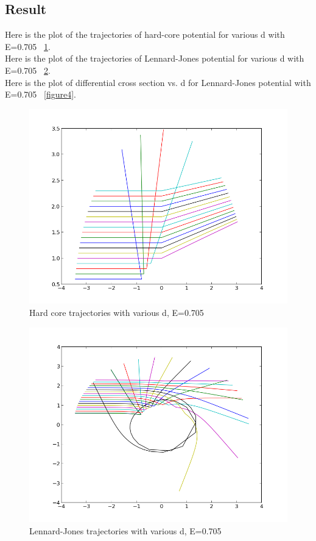 \documentclass[11pt,letterpaper]{article}
\begin{document}
\subsection{Result}
Here is the plot of the trajectories of hard-core potential for various d with E=0.705 ~\ref{figure2}.\\
Here is the plot of the trajectories of Lennard-Jones potential for various d with E=0.705 ~\ref{figure3}.\\
Here is the plot of differential cross section vs. d for Lennard-Jones potential with E=0.705 ~\ref{figure4}.\\


\begin{figure}
\begin{center}
\includegraphics[width=0.9\linewidth,angle=0]{p2allhard.png}
\caption{Hard core trajectories with various d, E=0.705}
\label{figure2}
\end{center}
\end{figure}


\begin{figure}
\begin{center}
\includegraphics[width=0.9\linewidth,angle=0]{p2alldtra.png}
\caption{Lennard-Jones trajectories with various d, E=0.705}
\label{figure3}
\end{center}
\end{figure}
\end{document}

